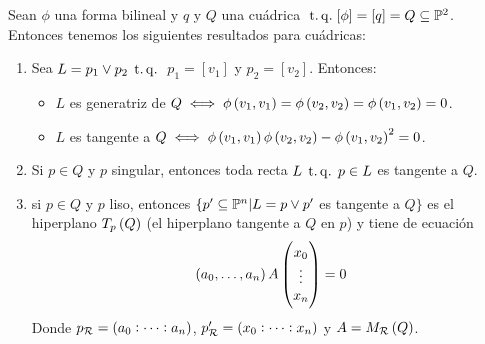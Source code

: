 \begin{prop}
  Sean $\phi$ una forma bilineal y $q$ y $Q$ una cuádrica $\operatorname{\;t.q.\;} [\phi]=[q]=Q\subseteq \mathbb{P}^2$.
  Entonces tenemos los siguientes resultados para cuádricas:
  \begin{enumerate}[(1)]
    \item Sea $L=p_1\vee p_2 \operatorname{\;t.q.\;}$ $p_1=[v_1]$ y $p_2=[v_2]$. Entonces:
      \begin{itemize}
        \item $L$ es generatriz de $Q \iff \phi \left( v_1,v_1\right) = \phi
          \left( v_2,v_2 \right) = \phi \left( v_1,v_2 \right) =0$.
        \item $L$ es tangente a $Q \iff \phi \left( v_1,v_1 \right) \phi \left( v_2,v_2 \right)
          - \phi \left( v_1,v_2 \right) ^2 =0$.
      \end{itemize}
    \item Si $p\in Q$ y $p$ singular, entonces toda recta $L \operatorname{\;t.q.\;} p\in L$ es tangente a $Q$.
    \item si $p\in Q$ y $p$ liso, entonces $\{ p'\subseteq \mathbb{P}^n | L=p\vee p'$ es tangente a $Q \}$
      es el hiperplano $T_p\left( Q \right)$ (el hiperplano tangente a $Q$ en $p$) y tiene de ecuación
      \[
        \left( a_0,\dots,a_n \right) A 
        \begin{pmatrix}
          x_0\\
          \vdots\\
          x_n\\
        \end{pmatrix} = 0
      \]
      Donde $p_{\mathcal{R}} = \left( a_0:\dots :a_n\right)$, $p'_{\mathcal{R}} = \left( x_0:\dots :x_n\right)$ y $A = M_{\mathcal{R}} \left( Q \right)$.
  \end{enumerate}
\end{prop}
